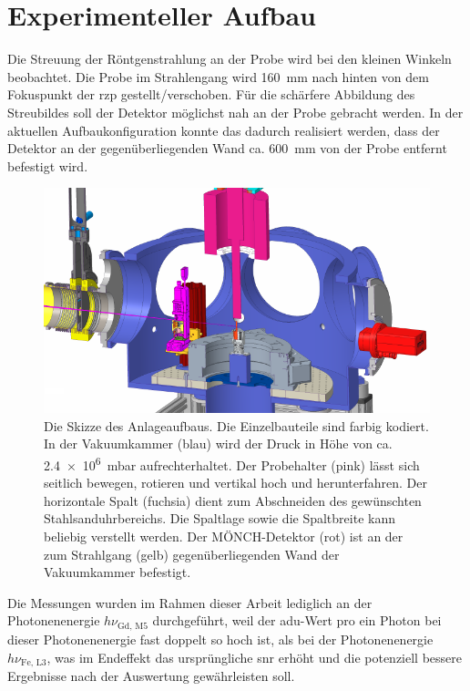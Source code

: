 \chapter{Experimenteller Aufbau}
Die Streuung der Röntgenstrahlung an der Probe wird bei den kleinen Winkeln beobachtet. Die Probe im Strahlengang wird \SI{160}{\milli\meter} nach hinten von dem Fokuspunkt der \gls{rzp} gestellt/verschoben. Für die schärfere Abbildung des Streubildes soll der Detektor möglichst nah an der Probe gebracht werden. In der aktuellen Aufbaukonfiguration konnte das dadurch realisiert werden, dass der Detektor an der gegenüberliegenden Wand ca. \SI{600}{\milli\meter} von der Probe entfernt befestigt wird.
\begin{figure}[H]
    \centering
    \includegraphics{images/aufbau/aufbau_empty.pdf}
    \caption{Die Skizze des Anlageaufbaus. Die Einzelbauteile sind farbig kodiert. In der Vakuumkammer (blau) wird der Druck in Höhe von ca. \SI{2.4e6}{\milli\bar} aufrechterhaltet. Der Probehalter (pink) lässt sich seitlich bewegen, rotieren und vertikal hoch und herunterfahren. Der horizontale Spalt (fuchsia) dient zum Abschneiden des gewünschten Stahlsanduhrbereichs. Die Spaltlage sowie die Spaltbreite kann beliebig verstellt werden. Der MÖNCH-Detektor (rot) ist an der zum Strahlgang (gelb) gegenüberliegenden Wand der Vakuumkammer befestigt.}
    \label{fig:anlage}
\end{figure}
\noindent
Die Messungen wurden im Rahmen dieser Arbeit lediglich an der Photonenenergie $h\nu_\text{Gd, M5}$ durchgeführt, weil der \gls{adu}-Wert pro ein Photon bei dieser Photonenenergie fast doppelt so hoch ist, als bei der Photonenenergie $h\nu_\text{Fe, L3}$, was im Endeffekt das ursprüngliche \gls{snr} erhöht und die potenziell bessere Ergebnisse nach der Auswertung gewährleisten soll.

